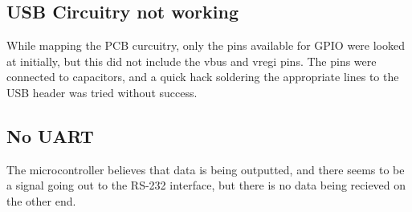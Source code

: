 \subsection{USB Circuitry not working}
While mapping the PCB curcuitry, only the pins available for GPIO were looked at initially, but this did not include the vbus and vregi pins.
The pins were connected to capacitors, and a quick hack soldering the appropriate lines to the USB header was tried without success.

\subsection{No UART}
The microcontroller believes that data is being outputted, and there seems to be a signal going out to the RS-232 interface, but there is no data being recieved on the other end.
